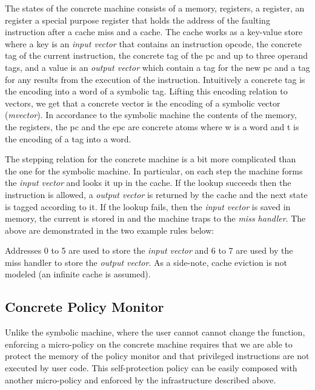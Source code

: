 The states of the concrete machine consists of a memory, registers, a \pc 
register, an \epc register a special purpose register that holds the address of
the faulting instruction after a cache miss and a cache.
The cache works as a key-value store where a key is an \emph{input vector} that
contains an instruction opcode, the concrete tag of the current instruction,
the concrete tag of the pc and up to three operand tags, and a value is an 
\emph{output vector} which contain a tag for the new pc and a tag for any
results from the execution of the instruction. Intuitively a concrete tag is the
encoding into a word of a symbolic tag. 
Lifting this encoding relation to vectors, we get that a concrete vector is the
encoding of a symbolic vector (\emph{mvector}). 
In accordance  to the symbolic machine
the contents of the memory, the registers, the pc and the epc are concrete atoms
 where w is a word and t is the encoding of a tag into a word.

The stepping relation for the concrete machine is a bit more complicated than
the one for the symbolic machine. In particular, on each step the machine forms
the \emph{input vector} and looks it up in the cache. If the lookup succeeds 
then the instruction is allowed, a \emph{output vector} is returned by the
cache and the next state is tagged according to it. 
If the lookup fails, then the \emph{input vector} is saved in memory, the 
current \pc is stored in \epc and the machine traps to the \emph{miss handler}.
The above are demonstrated in the two example rules below:


Addresses 0 to 5 are used to store the \emph{input vector} and 6 to 7 are used
by the miss handler to store the \emph{output vector}. As a side-note, cache 
eviction is not modeled (an infinite cache is assumed).

\subsection{Concrete Policy Monitor}\label{sec:concrete_policy}

Unlike the symbolic machine, where the user cannot cannot change the 
\TRANSFER function, enforcing a micro-policy on the concrete machine requires
that we are able to protect the memory of the policy monitor and that privileged
instructions are not executed by user code. This self-protection policy can be 
easily composed with another micro-policy and enforced by the infrastructure
described above. 

